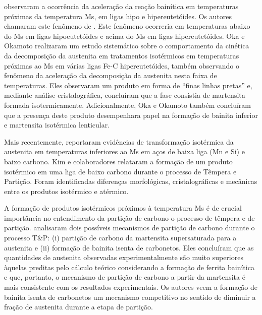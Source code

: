  observaram a ocorrência da aceleração da reação bainítica em temperaturas próximas da temperatura Ms, em ligas hipo e hipereutetóides. Os autores chamaram este fenômeno de . Este fenômeno ocorreria em temperaturas abaixo do Ms em ligas hipoeutetóides e acima do Ms em ligas hipereutetóides. Oka e Okamoto\cite{Okamoto1985,Oka1988} realizaram um estudo sistemático sobre o comportamento da cinética da decomposição da austenita em tratamentos isotérmicos em temperaturas próximas ao Ms em várias ligas Fe-C hipereutetóides, também observando o fenômeno da aceleração da decomposição da austenita nesta faixa de temperaturas. Eles observaram um produto em forma de ``finas linhas pretas'' e, mediante análise cristalográfica, concluíram que a fase consistia de martensita formada isotermicamente. Adicionalmente, Oka e Okamoto também concluíram que a presença deste produto desempenhara papel na formação de bainita inferior e martensita isotérmica lenticular.

Mais recentemente,  reportaram evidências de transformação isotérmica da austenita em temperaturas inferiores ao Ms em aços de baixa liga (Mn e Si) e baixo carbono. Kim e colaboradores\cite{Kim2010,Kim2012} relataram a formação de um produto isotérmico em uma liga de baixo carbono durante o processo de Têmpera e Partição. Foram identificadas diferenças morfológicas, cristalográficas e mecânicas entre os produtos isotérmico e atérmico.

A formação de produtos isotérmicos próximos à temperatura Ms é de crucial importância no entendimento da partição de carbono o processo de têmpera e de partição.  analisaram dois possíveis mecanismos de partição de carbono durante o processo T\&P: (i) partição de carbono da martensita supersaturada para a austenita e (ii) formação de bainita isenta de carbonetos. Eles concluíram que as quantidades de austenita observadas experimentalmente são muito superiores àquelas preditas pelo cálculo teórico considerando a formação de ferrita bainítica e que, portanto, o mecanismo de partição de carbono a partir da martensita é mais consistente com os resultados experimentais. Os autores veem a formação de bainita isenta de carbonetos um mecanismo competitivo no sentido de diminuir a fração de austenita durante a etapa de partição.



